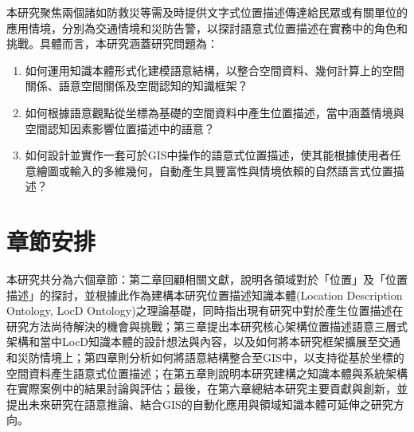 本研究聚焦兩個諸如防救災等需及時提供文字式位置描述傳達給民眾或有關單位的應用情境，分別為交通情境和災防告警，以探討語意式位置描述在實務中的角色和挑戰。具體而言，本研究涵蓋研究問題為：

\begin{enumerate}
    \item 如何運用知識本體形式化建模語意結構，以整合空間資料、幾何計算上的空間關係、語意空間關係及空間認知的知識框架？
    \item 如何根據語意觀點從坐標為基礎的空間資料中產生位置描述，當中涵蓋情境與空間認知因素影響位置描述中的語意？
    \item 如何設計並實作一套可於GIS中操作的語意式位置描述，使其能根據使用者任意繪圖或輸入的多維幾何，自動產生具豐富性與情境依賴的自然語言式位置描述？
\end{enumerate}

\section{章節安排}

本研究共分為六個章節：第二章回顧相關文獻，說明各領域對於「位置」及「位置描述」的探討，並根據此作為建構本研究位置描述知識本體(Location Description Ontology, LocD Ontology)之理論基礎，同時指出現有研究中對於產生位置描述在研究方法尚待解決的機會與挑戰；第三章提出本研究核心架構位置描述語意三層式架構和當中LocD知識本體的設計想法與內容，以及如何將本研究框架擴展至交通和災防情境上；第四章則分析如何將語意結構整合至GIS中，以支持從基於坐標的空間資料產生語意式位置描述；在第五章則說明本研究建構之知識本體與系統架構在實際案例中的結果討論與評估；最後，在第六章總結本研究主要貢獻與創新，並提出未來研究在語意推論、結合GIS的自動化應用與領域知識本體可延伸之研究方向。